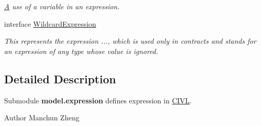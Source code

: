 \begin{DoxyCompactItemize}
\begin{DoxyCompactList}\small\item\em \hyperlink{structA}{A} use of a variable in an expression. \end{DoxyCompactList}\item 
interface \hyperlink{interfaceedu_1_1udel_1_1cis_1_1vsl_1_1civl_1_1model_1_1IF_1_1expression_1_1WildcardExpression}{Wildcard\+Expression}
\begin{DoxyCompactList}\small\item\em This represents the expression {\ttfamily ...}, which is used only in contracts and stands for an expression of any type whose value is ignored. \end{DoxyCompactList}\end{DoxyCompactItemize}


\subsection{Detailed Description}
Submodule {\bfseries model.\+expression} defines expression in \hyperlink{classedu_1_1udel_1_1cis_1_1vsl_1_1civl_1_1CIVL}{C\+I\+V\+L}. 

\begin{DoxyAuthor}{Author}
Manchun Zheng 
\end{DoxyAuthor}
